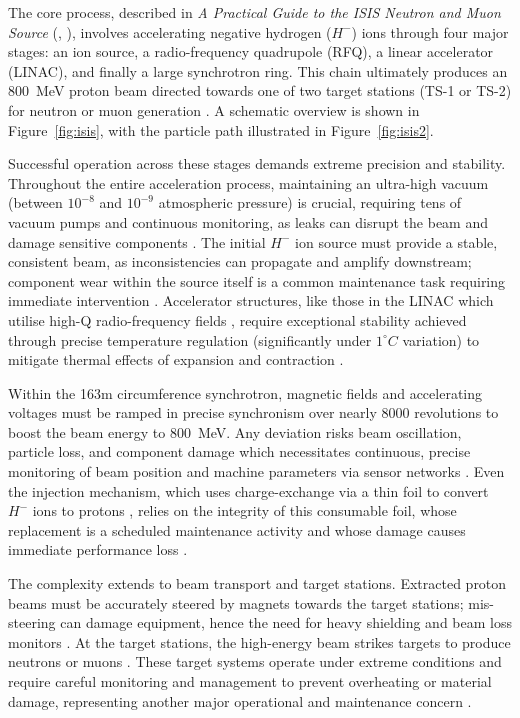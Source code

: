 \documentclass[10pt,oneside]{report}
\renewcommand{\citet}[1]{\citeauthor{#1}, \citeyear{#1}}
\begin{document}
The core process, described in \textit{A Practical Guide to the ISIS Neutron and Muon Source} (\citet{2021practicalguide}), involves accelerating negative hydrogen ($H^-$) ions through four major stages: an ion source, a radio-frequency quadrupole (RFQ), a linear accelerator (LINAC), and finally a large synchrotron ring. This chain ultimately produces an 800~MeV proton beam directed towards one of two target stations (TS-1 or TS-2) for neutron or muon generation \cite{2021practicalguide}. A schematic overview is shown in Figure~\ref{fig:isis}, with the particle path illustrated in Figure~\ref{fig:isis2}.

Successful operation across these stages demands extreme precision and stability. Throughout the entire acceleration process, maintaining an ultra-high vacuum (between $10^{-8}$ and $10^{-9}$ atmospheric pressure) is crucial, requiring tens of vacuum pumps and continuous monitoring, as leaks can disrupt the beam and damage sensitive components \cite{2021practicalguide}. The initial $H^-$ ion source must provide a stable, consistent beam, as inconsistencies can propagate and amplify downstream; component wear within the source itself is a common maintenance task requiring immediate intervention \cite{2021practicalguide}. Accelerator structures, like those in the LINAC which utilise high-Q radio-frequency fields \cite{michael2006electronic}, require exceptional stability achieved through precise temperature regulation (significantly under $1^\circ C$ variation) to mitigate thermal effects of expansion and contraction \cite{2021practicalguide}.

Within the 163m circumference synchrotron, magnetic fields and accelerating voltages must be ramped in precise synchronism over nearly 8000 revolutions to boost the beam energy to 800~MeV. Any deviation risks beam oscillation, particle loss, and component damage which necessitates continuous, precise monitoring of beam position and machine parameters via sensor networks \cite{2021practicalguide}. Even the injection mechanism, which uses charge-exchange via a thin foil to convert $H^-$ ions to protons \cite{2021practicalguide, ankenbrandt1980h}, relies on the integrity of this consumable foil, whose replacement is a scheduled maintenance activity and whose damage causes immediate performance loss \cite{2021practicalguide}.

The complexity extends to beam transport and target stations. Extracted proton beams must be accurately steered by magnets towards the target stations; mis-steering can damage equipment, hence the need for heavy shielding and beam loss monitors \cite{2021practicalguide}. At the target stations, the high-energy beam strikes targets to produce neutrons or muons \cite{sharma2001nuclear, 2021practicalguide}. These target systems operate under extreme conditions and require careful monitoring and management to prevent overheating or material damage, representing another major operational and maintenance concern \cite{2021practicalguide}.
\end{document}
